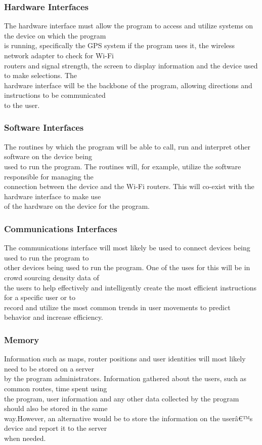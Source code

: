 \documentclass[a4paper,10pt]{article}
\begin{document}
		\subsubsection{Hardware Interfaces}
			The hardware interface must allow the program to access and utilize systems on the device on which the program\\			is running, specifically the GPS system if the program uses it, the wireless network adapter to check for Wi-Fi\\			routers and signal strength, the screen to display information and the device used to make selections. The\\				hardware interface will be the backbone of the program, allowing directions and instructions to be communicated\\			to the user.\\
		\subsubsection{Software Interfaces}
			The routines by which the program will be able to call, run and interpret other software on the device being\\				used to run the program. The routines will, for example, utilize the software responsible for managing the\\ 				connection between the device and the Wi-Fi routers. This will co-exist with the hardware interface to make use\\			of the hardware on the device for the program.\\
		\subsubsection{Communications Interfaces}
			The communications interface will most likely be used to connect devices being used to run the program to\\				other devices being used to run the program. One of the uses for this will be in crowd sourcing density data of\\			the users to help effectively and intelligently create the most efficient instructions for a specific user or to\\			record and utilize the most common trends in user movements to predict behavior and increase efficiency.\\
		\subsubsection{Memory}
			Information such as maps, router positions and user identities will most likely need to be stored on a server\\ 			by the program administrators. Information gathered about the users, such as common routes, time spent using\\ 				the program, user information and any other data collected by the program should also be stored in the same\\ 				way.However, an alternative would be to store the information on the userâ€™s device and report it to the server\\ 			when needed.\\   
\end{document}
